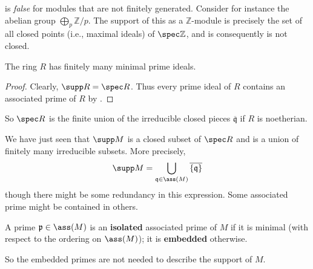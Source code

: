\begin{example} 
 is \emph{false} for modules that are not finitely
generated. Consider for instance the abelian group $\bigoplus_p \mathbb{Z}/p$.
The support of this as a $\mathbb{Z}$-module is precisely the set of all
closed points (i.e., maximal ideals) of $\spec \mathbb{Z}$, and is
consequently is not closed. 
\end{example} 

\begin{corollary} 
The ring $R$ has finitely many minimal prime ideals. 
\end{corollary} 
\begin{proof} 
Clearly, $\supp R = \spec R$. Thus every prime ideal of $R$
contains an associated prime of $R$ by .
\end{proof} 

So $\spec R$ is the finite union of the  irreducible closed  pieces
$\overline{\mathfrak{q}}$ if $R$ is noetherian.

We have just seen that $\supp M$ is a closed subset of $\spec R$ and is a union
of finitely many irreducible subsets.  More precisely, 
\[ \supp M = \bigcup_{\mathfrak{q} \in \ass(M)}
\overline{\left\{\mathfrak{q}\right\}}  \]
though there might be some redundancy in this expression. Some associated prime might be contained
in others.  

\begin{definition} 
A prime $\mathfrak{p} \in \ass(M)$ is an \textbf{isolated} associated prime of
$M$ if it is minimal (with respect to the ordering on $\ass(M)$); it is
\textbf{embedded} otherwise. 
\end{definition} 

So the embedded primes are not needed to describe the support of $M$. 


